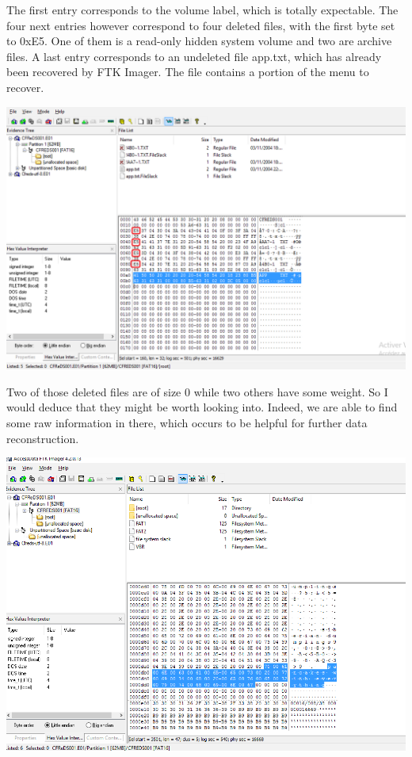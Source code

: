 \documentclass[
	12pt, %
]{fphw}
\begin{document}
The first entry corresponds to the volume label, which is totally expectable. The four next entries
however correspond to four deleted files, with the first byte set to 0xE5. One of them is a read-only
hidden system volume and two are archive files. A last entry corresponds to an undeleted file
app.txt, which has already been recovered by FTK Imager. The file contains a portion of the menu to
recover.

\begin{center}
	\includegraphics[width=0.8\columnwidth]{fig5.png}
	\label{fig:fig5}
\end{center}
\vspace{2mm}

Two of those deleted files are of size 0 while two others have some weight. So I would deduce that
they might be worth looking into. Indeed, we are able to find some raw information in there, which
occurs to be helpful for further data reconstruction.

\begin{center}
	\includegraphics[width=0.8\columnwidth]{fig6.png}
	\label{fig:fig6}
\end{center}
\vspace{2mm}
\end{document}
